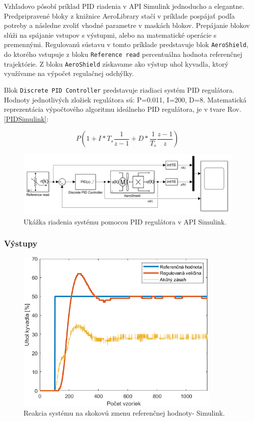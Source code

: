 Vzhľadovo pôsobí príklad PID riadenia v API Simulink jednoducho a elegantne. Predpripravené bloky z knižnice AeroLibrary stačí v príklade pospájať podľa potreby a následne zvoliť vhodné parametre v maskách blokov. Prepájanie blokov slúži na spájanie vstupov s výstupmi, alebo na matematické operácie s premennými. Regulovanú sústavu v tomto príklade predstavuje blok \verb|AeroShield|, do ktorého vstupuje z bloku \verb|Reference read| percentuálna hodnota referenčnej trajektórie. Z bloku \verb|AeroShield| získavame ako výstup uhol kyvadla, ktorý využívame na výpočet regulačnej odchýlky.  

Blok \verb|Discrete PID Controller| predstavuje riadiaci systém PID regulátora. Hodnoty jednotlivých zložiek regulátora sú: P=0.011, I=200, D=8. Matematická reprezentácia výpočtového algoritmu ideálneho PID regulátora, je v tvare Rov. \ref{PIDSimulink}:

\begin{equation}\label{PIDSimulink}
	P\left(1+I*T_s\dfrac{1}{z-1}+D*\dfrac{1}{T_s}\dfrac{z-1}{z}\right)
\end{equation}


\begin{figure}[!tbh]
	\centering
	\includegraphics[width=125mm]{obr/SimulinkPID.png}
	\caption{Ukážka riadenia systému pomocou PID regulátora v API Simulink.}\label{OBRAZOK 2.6.10}
\end{figure}

\subsubsection{Výstupy}

\begin{figure}[!tbh]
	\centering
	\includegraphics[width=100mm]{obr/SimSkok.png}
	\caption{Reakcia systému na skokovú zmenu referenčnej hodnoty- Simulink.}\label{OBRAZOK 2.6.11}
\end{figure}

